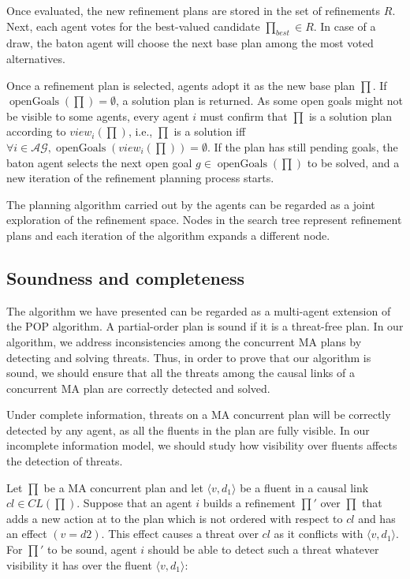 \documentclass[12pt]{article}
\DeclareMathOperator{\openGoals}{openGoals}
\begin{document}
Once evaluated, the new refinement plans are stored in the set of refinements $R$. Next, each agent votes for the best-valued candidate $\prod_{best} \in R$. In case of a draw, the baton agent will choose the next base plan among the most voted alternatives.

Once a refinement plan is selected, agents adopt it as the new base plan $\prod$. If $\openGoals(\prod) = \emptyset$, a solution plan is returned. As some open goals might not be visible to some agents, every agent $i$ must confirm that $\prod$ is a solution plan according to $view_i(\prod)$, i.e., $\prod$ is a solution iff $\forall i \in \mathcal{AG}, \openGoals(view_i(\prod)) = \emptyset$. If the plan has still pending goals, the baton agent selects the next open goal $g \in \openGoals(\prod)$ to be solved, and a new iteration of the refinement planning process starts.

The planning algorithm carried out by the agents can be regarded as a joint exploration of the refinement space. Nodes in the search tree represent refinement plans and each iteration of the algorithm expands a different node.

\subsection{Soundness and completeness}

The algorithm we have presented can be regarded as a multi-agent extension of the POP algorithm. A partial-order plan is sound if it is a threat-free plan. In our algorithm, we address inconsistencies among the concurrent MA plans by detecting and solving threats. Thus, in order to prove that our algorithm is sound, we should ensure that all the threats among the causal links of a concurrent MA plan are correctly detected and solved.

Under complete information, threats on a MA concurrent plan will be correctly detected by any agent, as all the fluents in the plan are fully visible. In our incomplete information model, we should study how visibility over fluents affects the detection of threats.

Let $\prod$ be a MA concurrent plan and let $\langle v,d_1\rangle$ be a fluent in a causal link $cl \in CL(\prod)$. Suppose that an agent $i$ builds a refinement $\prod'$ over $\prod$ that adds a new action at to the plan which is not ordered with respect to $cl$ and has an effect $(v = d2)$. This effect causes a threat over $cl$ as it conflicts with $\langle v,d_1\rangle$. For $\prod'$ to be sound, agent $i$ should be able to detect such a threat whatever visibility it has over the fluent $\langle v,d_1\rangle$:
\end{document}
